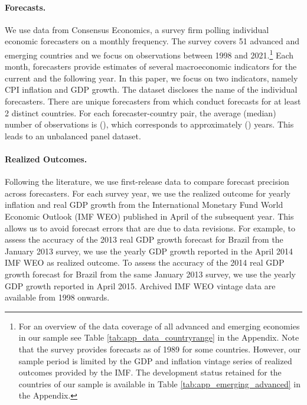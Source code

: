 
\paragraph{Forecasts.} We use data from Consensus Economics, a survey firm polling individual economic forecasters on a monthly frequency. The survey covers 51 advanced and emerging countries and we focus on observations between 1998 and 2021.\footnote{For an overview of the data coverage of all advanced and emerging economies in our sample see Table \ref{tab:app_data_countryrange} in the Appendix. Note that the survey provides forecasts as of 1989 for some countries. However, our sample period is limited by the GDP and inflation vintage series of realized outcomes provided by the IMF. The development status retained for the countries of our sample is available in Table \ref{tab:app_emerging_advanced} in the Appendix.} Each month, forecasters provide estimates of several macroeconomic indicators for the current and the following year. %
 In this paper, we focus on two indicators, namely CPI inflation and GDP growth. The dataset discloses the name of the individual forecasters. There are  unique forecasters from which  conduct forecasts for at least 2 distinct countries.  For each forecaster-country pair, the average (median) number of observations is  (), which corresponds to approximately  () years. This leads to an unbalanced panel dataset.


\paragraph{Realized Outcomes.} Following the literature, we use first-release data to compare forecast precision across forecasters. For each survey year, we use the realized outcome for yearly inflation and real GDP growth from the International Monetary Fund World Economic Outlook (IMF WEO) published in April of the subsequent year. This allows us to avoid forecast errors that are due to data revisions. For example, to assess the accuracy of the 2013 real GDP growth forecast for Brazil from the January 2013 survey, we use the yearly GDP growth reported in the April 2014 IMF WEO as realized outcome. To assess the accuracy of the 2014 real GDP growth forecast for Brazil from the same January 2013 survey, we use the yearly GDP growth reported in April 2015. %
 Archived IMF WEO vintage data are available from 1998 onwards.

